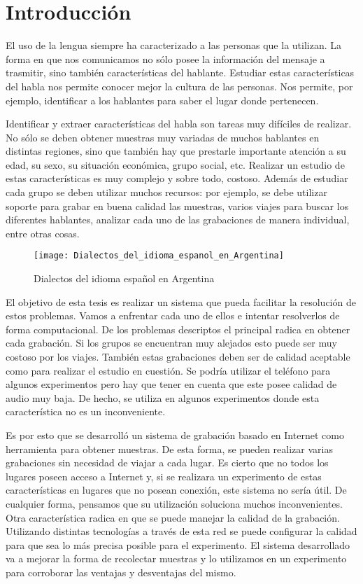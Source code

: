 
\chapter{Introducción}

El uso de la lengua siempre ha caracterizado a las personas que la utilizan. La forma en que nos comunicamos no sólo posee la información del mensaje a trasmitir, sino también características del hablante. Estudiar estas características del habla nos permite conocer mejor la cultura de las personas. Nos permite, por ejemplo, identificar a los hablantes para saber el lugar donde pertenecen.

Identificar y extraer características del habla son tareas muy difíciles de realizar. No sólo se deben obtener muestras muy variadas de muchos hablantes en distintas regiones, sino que también hay que prestarle importante atención a su edad, su sexo, su situación económica, grupo social, etc. Realizar un estudio de estas características es muy complejo y sobre todo, costoso. Además de estudiar cada grupo se deben utilizar muchos recursos: por ejemplo, se debe utilizar soporte para grabar en buena calidad las muestras, varios viajes para buscar los diferentes hablantes, analizar cada uno de las grabaciones de manera individual, entre otras cosas. 

\begin{figure}[h!]
	\centering
    \texttt{[image: Dialectos\_del\_idioma\_espanol\_en\_Argentina]} 
    \caption{Dialectos del idioma español en Argentina}
    \label{fig11}
\end{figure}

El objetivo de esta tesis es realizar un sistema que pueda facilitar la resolución de estos problemas. Vamos a enfrentar cada uno de ellos e intentar resolverlos de forma computacional. De los problemas descriptos el principal radica en obtener cada grabación. Si los grupos se encuentran muy alejados esto puede ser muy costoso por los viajes. También estas grabaciones deben ser de calidad aceptable como para realizar el estudio en cuestión. Se podría utilizar el teléfono para algunos experimentos pero hay que tener en cuenta que este posee calidad de audio muy baja. De hecho, se utiliza en algunos experimentos donde esta característica no es un inconveniente. 

Es por esto que se desarrolló un sistema de grabación basado en Internet como herramienta para obtener muestras. De esta forma, se pueden realizar varias grabaciones sin necesidad de viajar a cada lugar. Es cierto que no todos los lugares poseen acceso a Internet y, si se realizara un experimento de estas características en lugares que no posean conexión, este sistema no sería útil. De cualquier forma, pensamos que su utilización soluciona muchos inconvenientes. Otra característica radica en que se puede manejar la calidad de la grabación. Utilizando distintas tecnologías a través de esta red se puede configurar la calidad para que sea lo más precisa posible para el experimento. El sistema desarrollado va a mejorar la forma de recolectar muestras y lo utilizamos en un experimento para corroborar las ventajas y desventajas del mismo.

